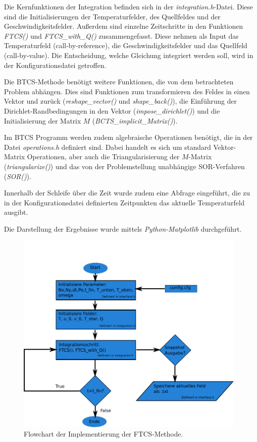 Die Kernfunktionen der Integration befinden sich in der \emph{integration.h}-Datei. Diese sind die Initialisierungen der Temperaturfelder, des Quellfeldes und der Geschwindigkeitsfelder.
Außerdem sind einzelne Zeitschritte in den Funktionen \emph{FTCS()} und \emph{FTCS\_with\_Q()} zusammengefasst. Diese nehmen als Input das Temperaturfeld (call-by-reference), die Geschwindigkeitsfelder und das Quellfeld (call-by-value).
Die Entscheidung, welche Gleichung integriert werden soll, wird in der Konfigurationsdatei getroffen.


Die BTCS-Methode benötigt weitere Funktionen, die von dem betrachteten Problem abhängen. Dies sind Funktionen zum transformieren des Feldes in einen Vektor und zurück (\emph{reshape\_vector()} und \emph{shape\_back()}), die Einführung der Dirichlet-Randbedingungen in den Vektor (\emph{impose\_dirichlet()}) und die Initialisierung der Matrix $M$ (\emph{BCTS\_implicit\_Matrix()}).

Im BTCS Programm werden zudem algebraische Operationen benötigt, die in der Datei \emph{operations.h} definiert sind.
Dabei handelt es sich um standard Vektor-Matrix Operationen, aber auch die Triangularisierung der $M$-Matrix (\emph{triangularize()}) und das von der Problemstellung unabhängige SOR-Verfahren (\emph{SOR()}).

Innerhalb der Schleife über die Zeit wurde zudem eine Abfrage eingeführt, die zu in der Konfigurationsdatei definierten Zeitpunkten das aktuelle Temperaturfeld ausgibt.

Die Darstellung der Ergebnisse wurde mittels \emph{Python-Matplotlib} durchgeführt.


\begin{figure}\centering
\includegraphics[width=0.4\textheight]{FTCSflow.pdf}\caption{Flowchart der Implementierung der FTCS-Methode.}\label{fig:FTCS}
\end{figure}

